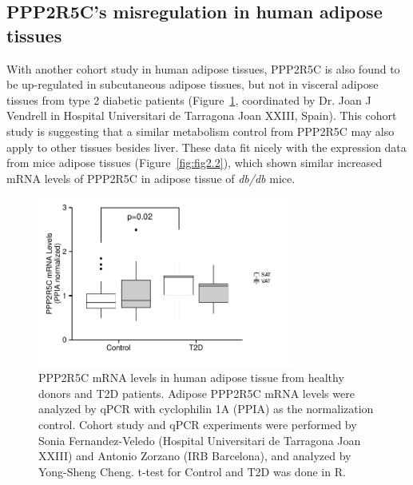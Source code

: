 \subsection{PPP2R5C's misregulation in human adipose tissues}

With another cohort study in human adipose tissues, PPP2R5C is also found to be up-regulated in subcutaneous adipose tissues, but not in visceral adipose tissues from type 2 diabetic patients (Figure~\ref{fig:fig2.64}, coordinated by Dr. Joan J Vendrell in Hospital Universitari de Tarragona Joan XXIII, Spain). This cohort study is suggesting that a similar metabolism control from PPP2R5C may also apply to other tissues besides liver. These data fit nicely with the expression data from mice adipose tissues (Figure~\ref{fig:fig2.2}), which shown similar increased mRNA levels of PPP2R5C in adipose tissue of \textit{db/db} mice.

\begin{figure}[htbp]
\centering
\includegraphics[width=0.75\textwidth]{figs/fig2-64 human adipose ppp2r5c.pdf}
\caption[PPP2R5C mRNA levels in human adipose tissue]{\footnotesize PPP2R5C mRNA levels in human adipose tissue from healthy donors and T2D patients. Adipose PPP2R5C mRNA levels were analyzed by qPCR with cyclophilin 1A (PPIA) as the normalization control. Cohort study and qPCR experiments were performed by Sonia Fernandez-Veledo (Hospital Universitari de Tarragona Joan XXIII) and Antonio Zorzano (IRB Barcelona), and analyzed by Yong-Sheng Cheng. t-test for Control and T2D was done in R.}
\label{fig:fig2.64}
\end{figure}


